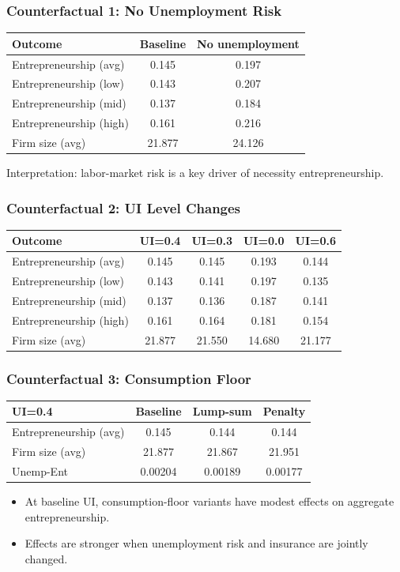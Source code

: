 \documentclass[english,aspectratio=169]{beamer}
\begin{document}
\begin{frame}
\frametitle{Counterfactual 1: No Unemployment Risk}
\begin{center}
\small
\begin{tabular}{lcc}
\hline
Outcome & Baseline & No unemployment \\
\hline
Entrepreneurship (avg) & 0.145 & 0.197 \\
Entrepreneurship (low) & 0.143 & 0.207 \\
Entrepreneurship (mid) & 0.137 & 0.184 \\
Entrepreneurship (high) & 0.161 & 0.216 \\
Firm size (avg) & 21.877 & 24.126 \\
\hline
\end{tabular}
\end{center}
\vspace{1mm}
Interpretation: labor-market risk is a key driver of necessity entrepreneurship.
\end{frame}

\begin{frame}
\frametitle{Counterfactual 2: UI Level Changes}
\begin{center}
\small
\begin{tabular}{lcccc}
\hline
Outcome & UI=0.4 & UI=0.3 & UI=0.0 & UI=0.6 \\
\hline
Entrepreneurship (avg) & 0.145 & 0.145 & 0.193 & 0.144 \\
Entrepreneurship (low) & 0.143 & 0.141 & 0.197 & 0.135 \\
Entrepreneurship (mid) & 0.137 & 0.136 & 0.187 & 0.141 \\
Entrepreneurship (high) & 0.161 & 0.164 & 0.181 & 0.154 \\
Firm size (avg) & 21.877 & 21.550 & 14.680 & 21.177 \\
\hline
\end{tabular}
\end{center}
\end{frame}

\begin{frame}
\frametitle{Counterfactual 3: Consumption Floor}
\begin{center}
\small
\begin{tabular}{lccc}
\hline
UI=0.4 & Baseline & Lump-sum & Penalty \\
\hline
Entrepreneurship (avg) & 0.145 & 0.144 & 0.144 \\
Firm size (avg) & 21.877 & 21.867 & 21.951 \\
Unemp-Ent & 0.00204 & 0.00189 & 0.00177 \\
\hline
\end{tabular}
\end{center}
\vspace{2mm}
\begin{itemize}
\item At baseline UI, consumption-floor variants have modest effects on aggregate entrepreneurship.
\item Effects are stronger when unemployment risk and insurance are jointly changed.
\end{itemize}
\end{frame}
\end{document}
